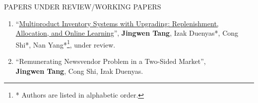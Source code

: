 \documentclass{resume}
\begin{document}
\begin{rSection}{PAPERS UNDER REVIEW/WORKING PAPERS}
\begin{enumerate}

  \item ``\href{https://papers.ssrn.com/sol3/papers.cfm?abstract_id=4781604}{Multiproduct Inventory Systems with Upgrading: Replenishment, Allocation, and Online Learning}'', \textbf{Jingwen Tang}, Izak Duenyas*, Cong Shi*, Nan Yang*\footnote{* Authors are listed in alphabetic order. }, under review. 

  
  
  
	\item ``Remunerating Newsvendor Problem
in a Two-Sided Market'', \\ \textbf{Jingwen Tang}, Cong Shi, Izak Duenyas.  
	

  
  




\end{enumerate}
\end{rSection}
\end{document}
